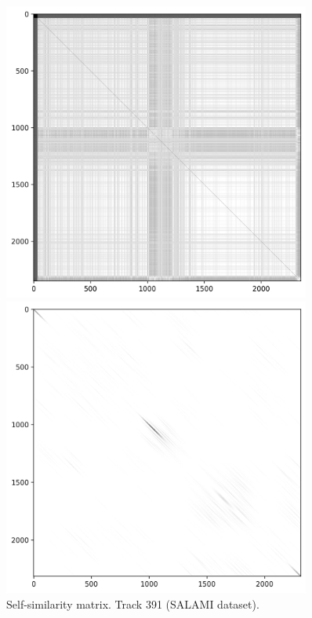 \begin{figure}[ht]
    \centering
    \begin{minipage}{0.45\textwidth}
        \centering
        \includegraphics[width=0.9\textwidth]{figures/images/salami_391_R matrix after Gaussian smoothing.png} %
        \caption[Track 391 (SALAMI dataset) Self-similarity matrix]{Self-similarity matrix. Track 391 (SALAMI dataset).}
    \end{minipage}\hfill
    \begin{minipage}{0.45\textwidth}
        \centering
        \includegraphics[width=0.9\textwidth]{figures/images/salami_391_Lag matrix after Gaussian smoothing.png} %

\end{minipage}
\end{figure}
